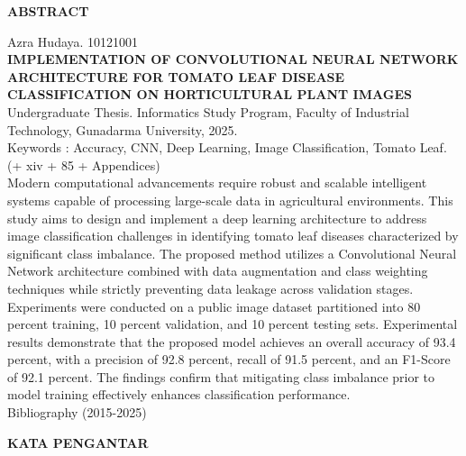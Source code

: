 \documentclass[12pt,a4paper,oneside]{report}
\begin{document}
\begin{singlespace}
\begin{center}
  {\fontsize{14}{16}\bfseries ABSTRACT}\\[0.8cm]
\end{center}

\noindent
Azra Hudaya. 10121001\\
\textbf{IMPLEMENTATION OF CONVOLUTIONAL NEURAL NETWORK ARCHITECTURE FOR TOMATO LEAF DISEASE CLASSIFICATION ON HORTICULTURAL PLANT IMAGES}\\
Undergraduate Thesis. Informatics Study Program, Faculty of Industrial Technology, Gunadarma University, 2025.\\
Keywords : Accuracy, CNN, Deep Learning, Image Classification, Tomato Leaf.\\
(+ xiv + 85 + Appendices)\\[0.5cm]

Modern computational advancements require robust and scalable intelligent systems capable of processing large-scale data in agricultural environments. This study aims to design and implement a deep learning architecture to address image classification challenges in identifying tomato leaf diseases characterized by significant class imbalance. The proposed method utilizes a Convolutional Neural Network architecture combined with data augmentation and class weighting techniques while strictly preventing data leakage across validation stages. Experiments were conducted on a public image dataset partitioned into 80 percent training, 10 percent validation, and 10 percent testing sets. Experimental results demonstrate that the proposed model achieves an overall accuracy of 93.4 percent, with a precision of 92.8 percent, recall of 91.5 percent, and an F1-Score of 92.1 percent. The findings confirm that mitigating class imbalance prior to model training effectively enhances classification performance.\\[0.8cm]

\noindent
Bibliography (2015-2025)
\end{singlespace}
\newpage

\begin{center}
  {\fontsize{14}{16}\bfseries KATA PENGANTAR}\\[1cm]
\end{center}
\end{document}
